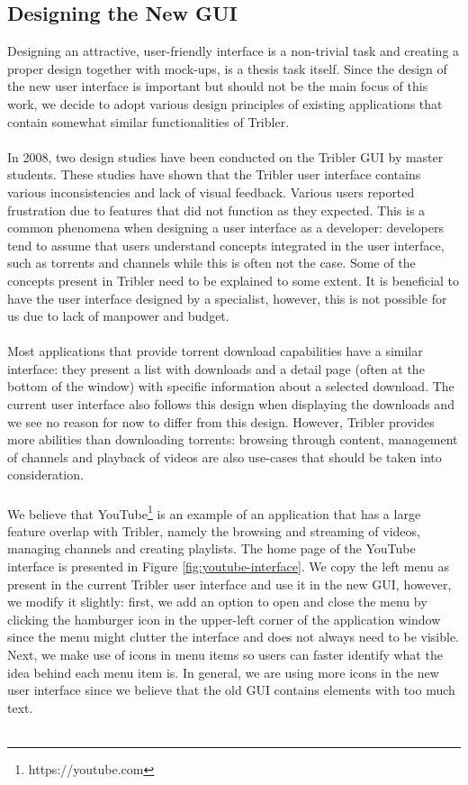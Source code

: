 \subsection{Designing the New GUI}
Designing an attractive, user-friendly interface is a non-trivial task and creating a proper design together with mock-ups, is a thesis task itself. Since the design of the new user interface is important but should not be the main focus of this work, we decide to adopt various design principles of existing applications that contain somewhat similar functionalities of Tribler.\\\\
In 2008, two design studies have been conducted on the Tribler GUI by master students\cite{triblerusabilityc2}\cite{triblerusabilityc4}. These studies have shown that the Tribler user interface contains various inconsistencies and lack of visual feedback. Various users reported frustration due to features that did not function as they expected. This is a common phenomena when designing a user interface as a developer: developers tend to assume that users understand concepts integrated in the user interface, such as torrents and channels while this is often not the case. Some of the concepts present in Tribler need to be explained to some extent. It is beneficial to have the user interface designed by a specialist, however, this is not possible for us due to lack of manpower and budget.\\\\
Most applications that provide torrent download capabilities have a similar interface: they present a list with downloads and a detail page (often at the bottom of the window) with specific information about a selected download. The current user interface also follows this design when displaying the downloads and we see no reason for now to differ from this design. However, Tribler provides more abilities than downloading torrents: browsing through content, management of channels and playback of videos are also use-cases that should be taken into consideration.\\\\
We believe that YouTube\footnote{https://youtube.com} is an example of an application that has a large feature overlap with Tribler, namely the browsing and streaming of videos, managing channels and creating playlists. The home page of the YouTube interface is presented in Figure \ref{fig:youtube-interface}. We copy the left menu as present in the current Tribler user interface and use it in the new GUI, however, we modify it slightly: first, we add an option to open and close the menu by clicking the hamburger icon in the upper-left corner of the application window since the menu might clutter the interface and does not always need to be visible. Next, we make use of icons in menu items so users can faster identify what the idea behind each menu item is. In general, we are using more icons in the new user interface since we believe that the old GUI contains elements with too much text.\\\\
